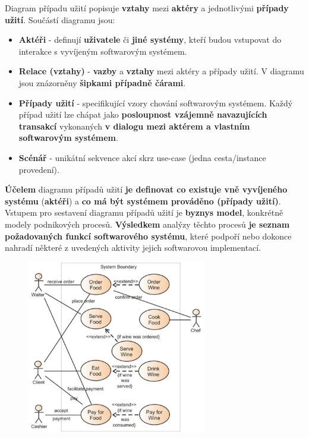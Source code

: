 Diagram případu užití popisuje \textbf{vztahy} mezi \textbf{aktéry} a jednotlivými \textbf{případy užití}. Součástí diagramu jsou:
\begin{itemize}
\item \textbf{Aktéři} - definují \textbf{uživatele} či \textbf{jiné systémy}, kteří budou vstupovat do interakce s vyvíjeným softwarovým systémem.
\item \textbf{Relace (vztahy)} - \textbf{vazby} a \textbf{vztahy} mezi aktéry a případy užití. V diagramu jsou znázorněny \textbf{šipkami případně čárami}.
\item \textbf{Případy užití} - specifikující vzory chování  softwarovým systémem.  Každý případ užití lze chápat jako \textbf{posloupnost vzájemně navazujících transakcí} vykonaných \textbf{v dialogu mezi aktérem a vlastním softwarovým systémem}.
\item \textbf{Scénář} - unikátní sekvence akcí skrz use-case (jedna cesta/instance provedení).
\end{itemize}
\textbf{Účelem} diagramu případů užití \textbf{je definovat co existuje vně vyvíjeného systému} (\textbf{aktéři}) a \textbf{co má být systémem prováděno (případy užití)}. Vstupem pro sestavení diagramu případů užití je \textbf{byznys model}, konkrétně modely podnikových procesů.  \textbf{Výsledkem} analýzy těchto procesů \textbf{je seznam požadovaných funkcí softwarového systému}, které podpoří nebo dokonce nahradí některé z uvedených aktivity jejich softwarovou implementací.

\begin{figure}[H]
	\centering
	\includegraphics[width=0.7\textwidth]{assets/usecase.png}
\end{figure}

